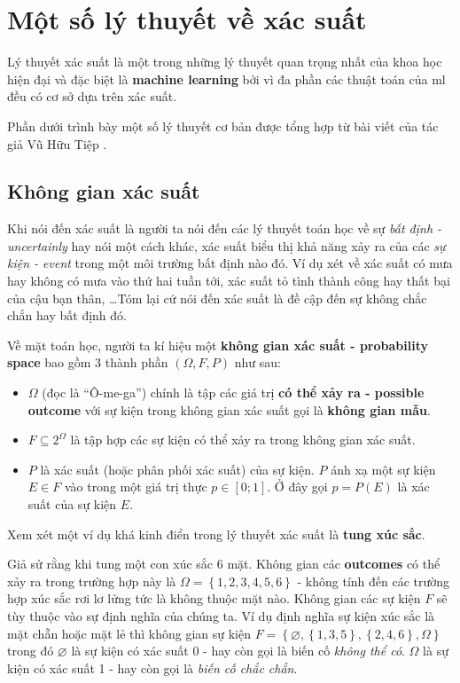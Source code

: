 \documentclass[../main-report.tex]{subfiles}
\begin{document}
\section{Một số lý thuyết về xác suất}
Lý thuyết xác suất là một trong những lý thuyết quan trọng nhất của khoa học hiện đại và đặc biệt là \textbf{machine learning} bởi vì đa phần các thuật toán của \gls{ml} đều có cơ sở dựa trên xác suất.

Phần dưới trình bày một số lý thuyết cơ bản được tổng hợp từ bài viết của tác giả Vũ Hữu Tiệp \citep{MLCB:xacsuat}.
\subsection{Không gian xác suất}
Khi nói đến xác suất là người ta nói đến các lý thuyết toán học về sự \textit{bất định - uncertainly} hay nói một cách khác, xác suất biểu thị khả năng xảy ra của các \textit{sự kiện - event} trong một môi trường bất định nào đó. Ví dụ xét về xác suất có mưa hay không có mưa vào thứ hai tuần tới, xác suất tỏ tình thành công hay thất bại của cậu bạn thân, \ldots Tóm lại cứ nói đến xác suất là đề cập đến sự không chắc chắn hay bất định đó.

Về mặt toán học, người ta kí hiệu một \textbf{không gian xác suất - probability space} bao gồm 3 thành phần $(\Omega, F, P)$ như sau:

\begin{itemize}
\item $\Omega$ (đọc là ``Ô-me-ga'') chính là tập các giá trị \textbf{có thể xảy ra - possible outcome} với sự kiện trong không gian xác suất gọi là \textbf{không gian mẫu}.
\item $F \subseteq 2^{\Omega}$ là tập hợp các sự kiện có thể xảy ra trong không gian xác suất.
\item $P$ là xác suất (hoặc phân phối xác suất) của sự kiện. $P$ ánh xạ một sự kiện $E \in F$ vào trong một giá trị thực $p \in \left [ 0;1 \right ]$. Ở đây gọi $p = P(E)$ là xác suất của sự kiện $E$.
\end{itemize}


Xem xét một ví dụ khá kinh điển trong lý thuyết xác suất là \textbf{tung xúc sắc}.

\begin{example} \label{ex:xuc_sac}
Giả sử rằng khi tung một con xúc sắc 6 mặt. Không gian các \textbf{outcomes} có thể xảy ra trong trường hợp này là $\Omega = \left \{ 1, 2, 3, 4, 5, 6 \right \}$ - không tính đến các trường hợp xúc sắc rơi lơ lửng tức là không thuộc mặt nào. Không gian các sự kiện $F$ sẽ tùy thuộc vào sự định nghĩa của chúng ta. Ví dụ định nghĩa sự kiện xúc sắc là mặt chẵn hoặc mặt lẻ thì không gian sự kiện $F=\left \{ \varnothing , \left \{ 1, 3, 5 \right \}, \left \{ 2, 4, 6 \right \}, \Omega \right \}$ trong đó $\varnothing$ là sự kiện có xác suất 0 - hay còn gọi là biến cố \textit{không thể có}. $\Omega$ là sự kiện có xác suất 1 - hay còn gọi là \textit{biến cố chắc chắn}.
\end{example}
\end{document}
